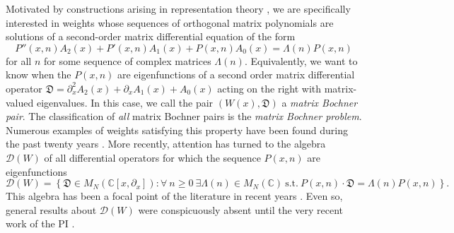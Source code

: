 \documentclass[11pt,letterpaper]{article}
\theoremstyle{definition}
\newcommand{\bbc}{\mathbb{C}}
\newcommand{\vocab}[1]{\emph{#1}}
\begin{document}
Motivated by constructions arising in representation theory \cite{GP,GP2,KRR,KPR}, we are specifically interested in weights whose sequences of orthogonal matrix polynomials are solutions of a second-order matrix differential equation of the form
\begin{equation}\label{basic eigenvalue equation}
P''(x,n)A_2(x) + P'(x,n)A_1(x) + P(x,n)A_0(x) = \Lambda(n)P(x,n)
\end{equation}
for all $n$ for some sequence of complex matrices $\Lambda(n)$.
Equivalently, we want to know when the $P(x,n)$ are eigenfunctions of a second order matrix differential operator $\mathfrak D = \partial_x^2 A_2(x) + \partial_x A_1(x) + A_0(x)$ acting on the right with matrix-valued eigenvalues.
In this case, we call the pair $(W(x),\mathfrak D)$ a \vocab{matrix Bochner pair}.
The classification of \emph{all} matrix Bochner pairs is the \vocab{matrix Bochner problem}.
Numerous examples of weights satisfying this property have been found during the past twenty years \cite{duran2004, duran2005c,grunbaum2005}.
More recently, attention has turned to the algebra $\mathcal D(W)$ of all differential operators for which the sequence $P(x,n)$ are eigenfunctions
\begin{equation}\label{D(W) def}
\mathcal D(W) = \left\lbrace  \mathfrak D\in M_N(\bbc[x,\partial_x]): \forall\ n\geq 0\ \exists \Lambda(n)\in M_N(\bbc)\ \text{s.t.}\ P(x,n)\cdot\mathfrak D = \Lambda(n)P(x,n)\right\rbrace.
\end{equation}
This algebra has been a focal point of the literature in recent years \cite{castro2006,grunbaum2007b,zurrian2016,tirao2011,zurrian2016algebra}.  Even so, general results about $\mathcal D(W)$ were conspicuously absent until the very recent work of the PI \cite{casper2017,CY2018}.
\end{document}
